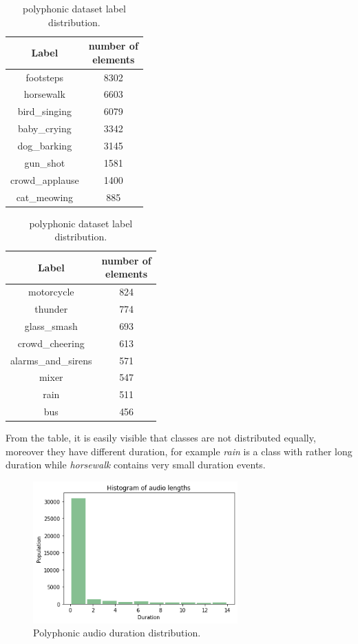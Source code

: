 \documentclass{article}
\begin{document}
\begin{table}[H]
	\begin{center}
		\begin{tabular}{ |c | c | }
			\hline
			Label 				& \makecell{number of\\ elements} \\ 
			\hline
			footsteps 			& 8302 \\
			\hline
			horsewalk			& 6603 \\
			\hline
			bird\_singing 		& 6079 \\
			\hline
			baby\_crying 		& 3342 \\
			\hline
			dog\_barking 		& 3145 \\
			\hline
			gun\_shot 			& 1581 \\
			\hline
			crowd\_applause 	& 1400 \\
			\hline
			cat\_meowing 		& 885 \\
			\hline
		\end{tabular}
		\begin{tabular}{ |c | c | }
			\hline
			Label 				& \makecell{number of\\ elements} \\ 
			\hline
			motorcycle 			& 824 \\
			\hline
			thunder 			& 774 \\
			\hline
			glass\_smash 		& 693 \\
			\hline
			crowd\_cheering 	& 613 \\
			\hline
			alarms\_and\_sirens & 571 \\
			\hline
			mixer 				& 547 \\
			\hline
			rain 				& 511 \\
			\hline
			bus 				& 456 \\
			\hline
		\end{tabular}
		\caption{polyphonic dataset label distribution.}
		\label{tab:poly_distribution}
	\end{center}
\end{table}

From the table, it is easily visible that classes are not distributed equally, moreover they have different duration, for example \textit{rain} is a class with rather long duration while \textit{horsewalk} contains very small duration events. 

\begin{figure}[H]
	\centering
	\includegraphics[width=0.7\textwidth]{./images/poly/duration.png}	
	\caption{Polyphonic audio duration distribution.}
	\label{fig:poly_duration}
\end{figure}
\end{document}
